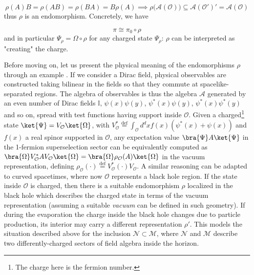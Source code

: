 \documentclass[a4paper,11pt]{article}
\newcommand{\eqdef}{\overset{\mathrm{def}}{=}}
\begin{document}
\begin{equation}
    \rho (A) B = \rho(AB) = \rho(BA) = B \rho(A) \implies \rho \big( \mathcal{A}(\mathcal{O}) \big) \subseteq \mathcal{A}(\mathcal{O}')' = \mathcal{A}(\mathcal{O})
\end{equation}
%
thus $\rho$ is an endomorphism. Concretely, we have

\begin{equation}
    \pi \cong \pi_0 \circ \rho
\end{equation}
%
and in particular $\Psi_{\rho} = \Omega \circ \rho$ for any charged state $\Psi_{\rho}$: $\rho$ can be interpreted as "creating" the charge.

Before moving on, let us present the physical meaning of the endomorphisms $\rho$ through an example \cite{Casini}. If we consider a Dirac field, physical observables are constructed taking bilinear in the fields so that they commute at spacelike-separated regions. The algebra of observables is thus the algebra $\mathcal{A}$ generated by an even number of Dirac fields $\mathbb{I}$, $\psi(x) \psi(y)$, $\psi^*(x) \psi(y)$, $\psi^*(x) \psi^*(y)$ and so on, spread with test functions having support inside $\mathcal{O}$. Given a charged\footnote{The charge here is the fermion number.} state $\ket{\Psi} = V_{\mathcal{O}} \ket{\Omega}$, with $V_{\mathcal{O}}^* \eqdef \int_{\mathcal{O}} d^d x f(x) \left( \psi^*(x) + \psi(x) \right)$ and $f(x)$ a real spinor supported in $\mathcal{O}$, any expectation value $\bra{\Psi} A \ket{\Psi}$ in the 1-fermion superselection sector can be equivalently computed as $\bra{\Omega} V_{\mathcal{O}}^* A V_{\mathcal{O}} \ket{\Omega} = \bra{\Omega} \rho_{\mathcal{O}}(A) \ket{\Omega}$ in the vacuum representation, defining $\rho_{\mathcal{O}}(\cdot) \eqdef V_{\mathcal{O}}^* (\cdot) V_{\mathcal{O}}$.
A similar reasoning can be adapted to curved spacetimes, where now $\mathcal{O}$ represents a black hole region. If the state inside $\mathcal{O}$ is charged, then there is a suitable endomorphism $\rho$ localized in the black hole which describes the charged state in terms of the vacuum representation (assuming a suitable \textit{vacuum} can be defined in such geometry). If during the evaporation the charge inside the black hole changes due to particle production, its interior may carry a different representation $\rho'$. This models the situation described above for the inclusion $\mathcal{N} \subset \mathcal{M}$, where $\mathcal{N}$ and $\mathcal{M}$ describe two differently-charged sectors of field algebra inside the horizon.
\end{document}
